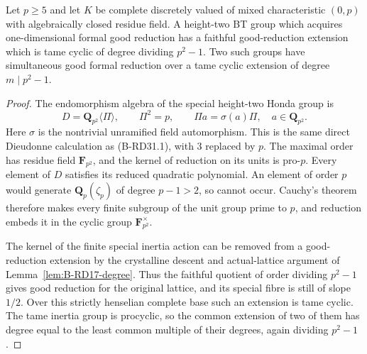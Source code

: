 \begin{lemma}
\label{lem:B-RD49-inertia}
Let $p\geq5$ and let $K$ be complete discretely valued of mixed
characteristic $(0,p)$ with algebraically closed residue field.
A height-two BT group which acquires one-dimensional formal good
reduction has a faithful good-reduction extension which is tame
cyclic of degree dividing $p^2-1$. Two such groups have simultaneous
good formal reduction over a tame cyclic extension of degree
$m\mid p^2-1$.
\end{lemma}
\begin{proof}
The endomorphism algebra of the special height-two Honda group is
\[
 D=\mathbf Q_{p^2}\langle\Pi\rangle,
 \qquad \Pi^2=p,\qquad \Pi a=\sigma(a)\Pi,
 \quad a\in\mathbf Q_{p^2}.
                                                        \tag{B-RD49.7}
\]
Here $\sigma$ is the nontrivial unramified field automorphism. This is the same direct Dieudonne calculation
as (B-RD31.1), with $3$ replaced by $p$.
The maximal order has residue field $\mathbf F_{p^2}$, and the
kernel of reduction on its units is pro-$p$.
Every element of $D$ satisfies its reduced quadratic polynomial.
An element of order $p$ would generate
$\mathbf Q_p(\zeta_p)$ of degree $p-1>2$, so cannot occur.
Cauchy's theorem therefore makes every finite subgroup of the
unit group prime to $p$, and reduction embeds it in the cyclic
group $\mathbf F_{p^2}^{\times}$.

The kernel of the finite special inertia action can be removed
from a good-reduction extension by the crystalline descent and
actual-lattice argument of Lemma~\ref{lem:B-RD17-degree}.
Thus the faithful quotient of order dividing $p^2-1$ gives good
reduction for the original lattice, and its special fibre is still
of slope $1/2$. Over this strictly henselian complete base such an
extension is tame cyclic. The tame inertia group is procyclic,
so the common extension of two of them has degree equal to the
least common multiple of their degrees, again dividing $p^2-1$.
\end{proof}

